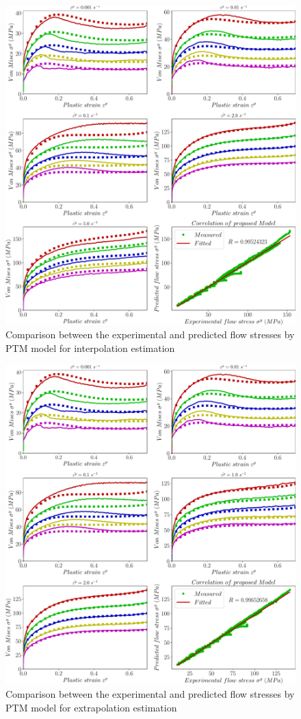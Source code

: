 \documentclass[twoside,english,1p,final,sort&compress]{elsarticle}
\theoremstyle{plain}
\begin{document}
\begin{figure}[!ht]
\centering
\includegraphics[width=1.02\columnwidth]
{newFigures/iCorrelationPTM}
\caption{Comparison between the experimental and predicted flow stresses by PTM model for interpolation estimation}
\label{fig:iCorrelationPTM}
\end{figure}
\begin{figure}[!ht]
\centering
\includegraphics[width=1.02\columnwidth]
{newFigures/eCorrelationPTM}
\caption{Comparison between the experimental and predicted flow stresses by PTM model for extrapolation estimation}
\label{fig:eCorrelationPTM}
\end{figure}
\end{document}
